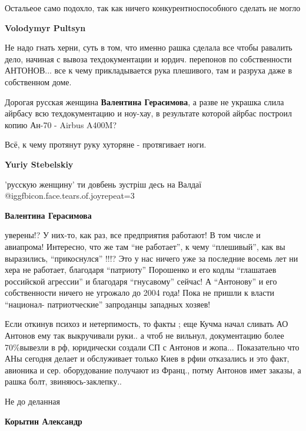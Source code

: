 \begin{itemize}
\begin{itemize}
\begin{itemize}
Остальеое само подохло, так как ничего конкурентноспособного сделать не могло

\end{itemize} %

\textbf{Volodymyr Pultsyn} 

Не надо гнать херни, суть в том, что именно рашка сделала все чтобы равалить
дело, начиная с вывоза техдокументации и юрдич. перепонов по собственности
АНТОНОВ... все к чему прикладывается рука плешивого, там и разруха даже в
собственном доме.

\begin{itemize} %

Дорогая русская женщина \textbf{Валентина Герасимова}, а разве не украшка слила
айрбасу всю техдокументацию и ноу-хау, в результате которой айрбас построил
копию Ан-70 - Airbus A400M?

Всё, к чему протянут руку хуторяне - протягивает ноги.

\textbf{Yuriy Stebelskiy} 

'русскую женщину' ти довбень зустріш десь на Валдаї
@igg{fbicon.face.tears.of.joy}{repeat=3} 

\textbf{Валентина Герасимова} 

уверены!? У них-то, как раз, все предприятия работают! В том числе и авиапрома!
Интересно, что же там \enquote{не работает}, к чему \enquote{плешивый}, как вы
выразились, \enquote{прикоснулся} !!!? Это у нас ничего уже за последние восемь лет ни
хера не
работает, благодаря \enquote{патриоту} Порошенко и его кодлы \enquote{глашатаев российской
агрессии} и благодаря \enquote{гнусавому} сейчас! А \enquote{Антонову} и его собственности
ничего не угрожало до 2004 года! Пока не пришли к власти \enquote{национал-
патриотческие} запроданцы западных хозяев!


Если откинув психоз и нетерпимость, то факты ; еще Кучма начал сливать АО
Антонов ему так выкручивали руки.. а чтоб не вильнул, документацию более
70\%вывезли в рф, юридически создали СП с Антонов и жопа... Показательно что АНы
сегодня делает и обслуживает только Киев в рфии отказались и это факт, авионика
и сер. оборудование получают из Франц., потму Антонов имет заказы, а рашка
болт, звиняюсь-заклепку..

Не до деланная

\textbf{Корытин Александр} 


\end{itemize}
\end{itemize}
\end{itemize}
